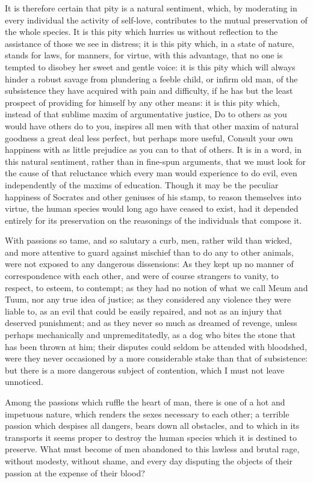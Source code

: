 \documentclass[11pt,twocolumn]{ltugboat}
\begin{document}
It is therefore certain that pity is a natural sentiment, which, by
moderating in every individual the activity of self-love, contributes
to the mutual preservation of the whole species. It is this pity
which hurries us without reflection to the assistance of those we see
in distress; it is this pity which, in a state of nature, stands for
laws, for manners, for virtue, with this advantage, that no one is
tempted to disobey her sweet and gentle voice: it is this pity which
will always hinder a robust savage from plundering a feeble child, or
infirm old man, of the subsistence they have acquired with pain and
difficulty, if he has but the least prospect of providing for himself
by any other means: it is this pity which, instead of that sublime
maxim of argumentative justice, Do to others as you would have others
do to you, inspires all men with that other maxim of natural goodness
a great deal less perfect, but perhaps more useful, Consult your own
happiness with as little prejudice as you can to that of others. It is
in a word, in this natural sentiment, rather than in fine-spun
arguments, that we must look for the cause of that reluctance which
every man would experience to do evil, even independently of the
maxims of education. Though it may be the peculiar happiness of
Socrates and other geniuses of his stamp, to reason themselves into
virtue, the human species would long ago have ceased to exist, had it
depended entirely for its preservation on the reasonings of the
individuals that compose it.

With passions so tame, and so salutary a curb, men, rather wild than
wicked, and more attentive to guard against mischief than to do any to
other animals, were not exposed to any dangerous dissensions: As they
kept up no manner of correspondence with each other, and were of
course strangers to vanity, to respect, to esteem, to contempt; as
they had no notion of what we call Meum and Tuum, nor any true idea of
justice; as they considered any violence they were liable to, as an
evil that could be easily repaired, and not as an injury that deserved
punishment; and as they never so much as dreamed of revenge, unless
perhaps mechanically and unpremeditatedly, as a dog who bites the
stone that has been thrown at him; their disputes could seldom be
attended with bloodshed, were they never occasioned by a more
considerable stake than that of subsistence: but there is a more
dangerous subject of contention, which I must not leave unnoticed.

Among the passions which ruffle the heart of man, there is one of a
hot and impetuous nature, which renders the sexes necessary to each
other; a terrible passion which despises all dangers, bears down all
obstacles, and to which in its transports it seems proper to destroy
the human species which it is destined to preserve. What must become
of men abandoned to this lawless and brutal rage, without modesty,
without shame, and every day disputing the objects of their passion at
the expense of their blood?
\end{document}
